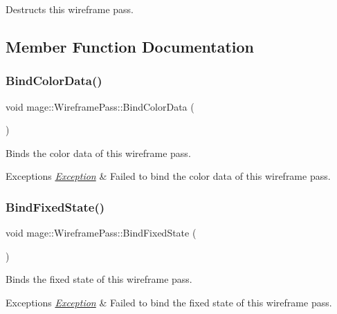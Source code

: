 Destructs this wireframe pass. 

\subsection{Member Function Documentation}
\hypertarget{classmage_1_1_wireframe_pass_a574897c1274585057e8d44070409b7e3}{}\label{classmage_1_1_wireframe_pass_a574897c1274585057e8d44070409b7e3} 
\subsubsection{\texorpdfstring{Bind\+Color\+Data()}{BindColorData()}}
{\footnotesize\ttfamily void mage\+::\+Wireframe\+Pass\+::\+Bind\+Color\+Data (\begin{DoxyParamCaption}{ }\end{DoxyParamCaption})\hspace{0.3cm}{\ttfamily [private]}}

Binds the color data of this wireframe pass.


\begin{DoxyExceptions}{Exceptions}
{\em \hyperlink{classmage_1_1_exception}{Exception}} & Failed to bind the color data of this wireframe pass. \\
\hline
\end{DoxyExceptions}
\hypertarget{classmage_1_1_wireframe_pass_abf99690ae099ed0ba0ca35c5d87ac0ef}{}\label{classmage_1_1_wireframe_pass_abf99690ae099ed0ba0ca35c5d87ac0ef} 
\subsubsection{\texorpdfstring{Bind\+Fixed\+State()}{BindFixedState()}}
{\footnotesize\ttfamily void mage\+::\+Wireframe\+Pass\+::\+Bind\+Fixed\+State (\begin{DoxyParamCaption}{ }\end{DoxyParamCaption})}

Binds the fixed state of this wireframe pass.


\begin{DoxyExceptions}{Exceptions}
{\em \hyperlink{classmage_1_1_exception}{Exception}} & Failed to bind the fixed state of this wireframe pass. \\
\hline
\end{DoxyExceptions}
\hypertarget{classmage_1_1_wireframe_pass_a6e316eaabf3afb71162490c1f3c244f3}{}\label{classmage_1_1_wireframe_pass_a6e316eaabf3afb71162490c1f3c244f3} 
